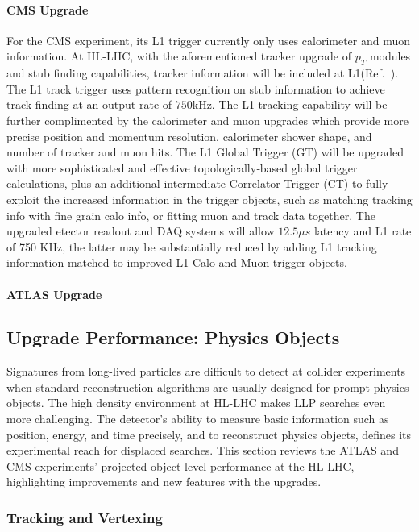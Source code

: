\paragraph{CMS Upgrade} 
For the CMS experiment, its L1 trigger currently only uses calorimeter and muon information. At HL-LHC, with the aforementioned tracker upgrade of $p_T$ modules and stub finding capabilities, tracker information will be included at L1(Ref.~\cite{Lourenco:2283192}). 
The L1 track trigger uses pattern recognition on stub information to achieve track finding at an output rate of $750$kHz. 
The L1 tracking capability will be further complimented by the calorimeter and muon upgrades which provide more precise position and momentum resolution, calorimeter shower shape, and number of tracker and muon hits.
The L1 Global Trigger (GT) will be upgraded with more sophisticated and effective topologically­‐based global trigger calculations, 
plus an additional intermediate Correlator Trigger (CT) to fully exploit the increased information in the trigger objects, such as matching tracking info with fine grain calo info, or fitting muon and track data together.
The upgraded etector readout and DAQ systems will allow $12.5 \mu s$ latency and L1 rate of 750 KHz, the latter may be substantially reduced by adding L1 tracking information matched to improved L1 Calo and Muon trigger objects. 

\paragraph{ATLAS Upgrade}

\subsection{Upgrade Performance: Physics Objects} \label{sec:upgradeobject}

Signatures from long-lived particles are difficult to detect at collider experiments when standard reconstruction algorithms are usually designed for prompt physics objects. The high density environment at HL-LHC makes LLP searches even more challenging. 
The detector's ability to measure basic information such as position, energy, and time precisely, and to reconstruct physics objects, defines its experimental reach for displaced searches.
This section reviews the ATLAS and CMS experiments' projected object-level performance at the HL-LHC, highlighting improvements and new features with the upgrades.

\subsubsection{Tracking and Vertexing} 

